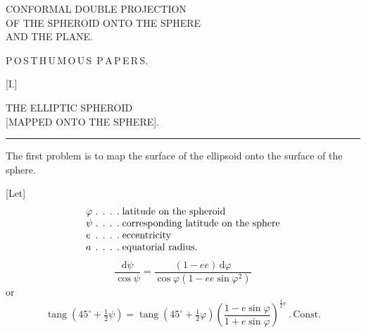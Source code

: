 \par\clearpage

\thispagestyle{empty}
\vspace*{\fill}
\begin{center}
\LARGE
CONFORMAL DOUBLE PROJECTION\\[.5ex]
OF THE SPHEROID ONTO THE SPHERE\\[.5ex]
AND THE PLANE.
\end{center}
\vspace*{\fill}

\par\clearpage

\thispagestyle{empty}
\null

\par\clearpage

\vspace*{.11\textheight}
\begin{center}{\LARGE P\,O\,S\,T\,H\,U\,M\,O\,U\,S\ P\,A\,P\,E\,R\,S.}\end{center}
\vspace{.05\textheight}
\begin{center}
[I.]\par\bigskip
{\Large THE ELLIPTIC SPHEROID\\
{[MAPPED ONTO THE SPHERE].}}\par\bigskip
\rule{.09\textwidth}{.4pt}\par\bigskip
[1.]
\end{center}

The first problem is to map the surface of the ellipsoid onto
the surface of the sphere.

[Let]
\[
\begin{array}{l@{\;\ldotp\;\ldotp\;\ldotp\;\ldotp\;}l}
\varphi & \text{latitude on the spheroid}\\
\psi & \text{corresponding latitude on the sphere}\\
e & \text{eccentricity}\\
a & \text{equatorial radius.}
\end{array}
\]
\[
\frac{\mathrm d\psi}{\cos\psi}
=\frac{(1-ee)\,\mathrm d\varphi}{\cos\varphi(1-ee\sin\varphi^2)}
\]
\noindent or
\[
\operatorname{tang}(45^\circ+\tfrac12\psi)
=\operatorname{tang}(45^\circ+\tfrac12\varphi)
\left(\frac{1-e\sin\varphi}{1+e\sin\varphi}\right)^{\frac12 e}\,.\,\text{Const.}
\]

